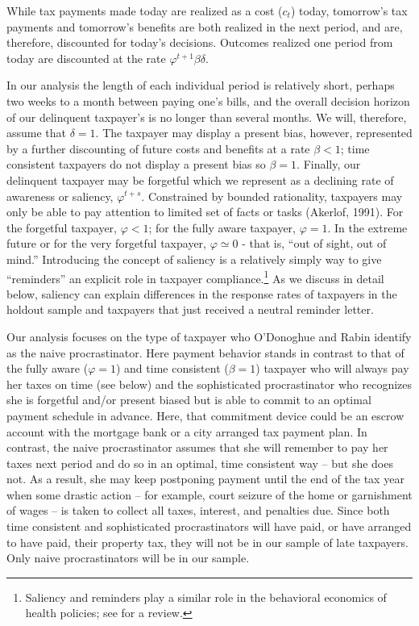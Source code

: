 \documentclass[12pt]{article}
\begin{document}
While tax payments made today are realized as a cost  ($c_{t}$) today,
tomorrow's tax payments and tomorrow's benefits are both realized in
the next period, and are, therefore, discounted for today's decisions.
Outcomes realized one period from today are discounted at the rate
$\varphi^{t+1} \beta \delta$.

In our analysis the length of each individual period is relatively
short, perhaps two weeks to a month between paying one's bills, and
the overall decision horizon of our delinquent taxpayer's is no longer
than several months.  We will, therefore, assume that $\delta=1$.  The
taxpayer may display a present bias, however, represented by a further
discounting of future costs and benefits at a rate $\beta <1$; time
consistent taxpayers do not display a present bias so $\beta=1$.
Finally, our delinquent taxpayer may be forgetful which we represent
as a declining rate of awareness or saliency, $\varphi^{t+s}$.
Constrained by bounded rationality, taxpayers may only be able to pay
attention to limited set of facts or tasks (Akerlof, 1991).  For the
forgetful taxpayer, $\varphi < 1$; for the fully aware taxpayer,
$\varphi = 1$. In the extreme future or for the very forgetful
taxpayer, $\varphi \simeq 0$ - that is, ``out of sight, out of mind.''
Introducing the concept of saliency is a relatively simply way to give
``reminders'' an explicit role in taxpayer compliance.\footnote{
  Saliency and reminders play a similar role in the behavioral
  economics of health policies; see  for a
  review.} As we discuss in detail below, saliency can explain
differences in the response rates of taxpayers in the holdout sample
and taxpayers that just received a neutral reminder letter.

Our analysis focuses on the type of taxpayer who O'Donoghue and Rabin
identify as the naive procrastinator.  Here payment behavior stands in
contrast to that of the fully aware ($\varphi = 1$) and time
consistent ($\beta = 1$) taxpayer who will always pay her taxes on
time (see below) and the sophisticated procrastinator who recognizes
she is forgetful and/or present biased but is able to commit to an
optimal payment schedule in advance.  Here, that commitment device
could be an escrow account with the mortgage bank or a city arranged
tax payment plan.  In contrast, the naive procrastinator assumes that
she will remember to pay her taxes next period and do so in an
optimal, time consistent way -- but she does not.  As a result, she
may keep postponing payment until the end of the tax year when some
drastic action -- for example, court seizure of the home or
garnishment of wages -- is taken to collect all taxes, interest, and
penalties due.  Since both time consistent and sophisticated
procrastinators will have paid, or have arranged to have paid, their
property tax, they will not be in our sample of late taxpayers.  Only
naive procrastinators will be in our sample.
\end{document}
